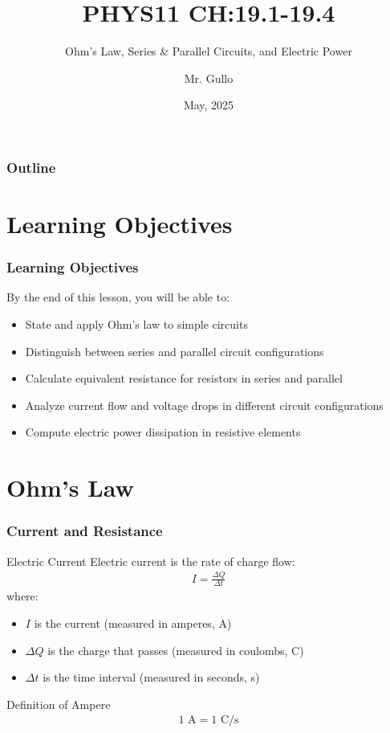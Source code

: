 \documentclass{beamer}
\title[Electric Circuits]{PHYS11 CH:19.1-19.4}
\subtitle{Ohm's Law, Series \& Parallel Circuits, and Electric Power}
\author[Mr. Gullo]{Mr. Gullo}
\date[May 2025]{May, 2025}
\begin{document}
\begin{frame}
\titlepage
\end{frame}

\begin{frame}
\frametitle{Outline}
\tableofcontents
\end{frame}

\section{Learning Objectives}

\begin{frame}
\frametitle{Learning Objectives}
By the end of this lesson, you will be able to:
\begin{itemize}
\item State and apply Ohm's law to simple circuits
\item Distinguish between series and parallel circuit configurations
\item Calculate equivalent resistance for resistors in series and parallel
\item Analyze current flow and voltage drops in different circuit configurations
\item Compute electric power dissipation in resistive elements
\end{itemize}
\end{frame}

\section{Ohm's Law}

\begin{frame}
\frametitle{Current and Resistance}
\begin{block}{Electric Current}
Electric current is the rate of charge flow:
\begin{align}
I = \frac{\Delta Q}{\Delta t}
\end{align}
where:
\begin{itemize}
\item $I$ is the current (measured in amperes, A)
\item $\Delta Q$ is the charge that passes (measured in coulombs, C)
\item $\Delta t$ is the time interval (measured in seconds, s)
\end{itemize}
\end{block}

\begin{block}{Definition of Ampere}
\begin{align}
1 \text{ A} = 1 \text{ C/s}
\end{align}
\end{block}
\end{frame}
\end{document}
